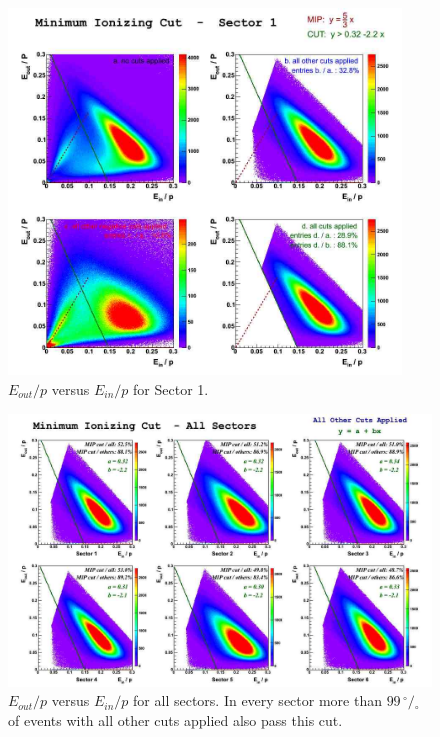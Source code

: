 \vspace{1cm}
\begin{figure}[h]
  \centering
		\includegraphics[width=0.93\textwidth]{img/EoEi_sect1.jpg}
		\caption{$E_{out}/p$ versus $E_{in}/p$ for Sector 1.}
 		\label{fig:EoEi}
\end{figure}


\clearpage\newpage
\begin{figure}[t]
  \centering
		\includegraphics[width=1.00\textwidth]{img/EoutEin_all_sectors.jpg}
		\caption{$E_{out}/p$ versus $E_{in}/p$ for all sectors. In every sector
					more than $99\,^{\circ\!\!}/\!_\circ$ of events with all other cuts applied also pass this cut. }
 		\label{fig:EoEi_all}
\end{figure}


